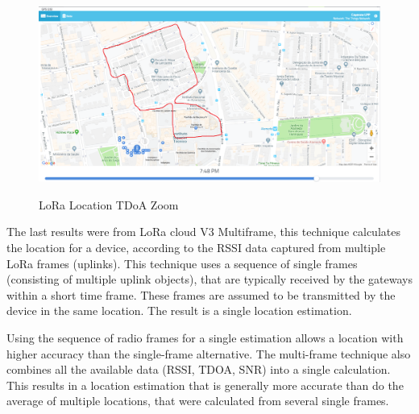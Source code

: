 \begin{figure}[htbp]
  \centering
  
    {\includegraphics[width=0.8\linewidth]{Chapters/Figures/lorageores25-1.PNG}}%
 
  \caption{LoRa Location TDoA Zoom}
  \label{fig:lora_geo_resTDOAZOM}
\end{figure}






The last results were from LoRa cloud V3 Multiframe, this technique calculates the location for a device, according to the RSSI data captured from multiple LoRa frames (uplinks). This technique uses a sequence of single frames (consisting of multiple uplink objects), that are typically received by the gateways within a short time frame. These frames are assumed to be transmitted by the device in the same location. The result is a single location estimation.

Using the sequence of radio frames for a single estimation allows a location with higher accuracy than the single-frame alternative. The multi-frame technique also combines all the available data (RSSI, TDOA, SNR) into a single calculation. This results in a location estimation that is generally more accurate than do the average of multiple locations, that were calculated from several single frames.


